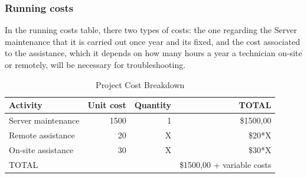\newpage 

\subsubsection{Running costs}
In the running costs table, there two types of costs: the one regarding the Server maintenance that it is carried out once year and its fixed, and the cost associated to the assistance, which it depends on how many hours a year a technician on-site or remotely, will be necessary for troubleshooting.
\begin{table}[htbp]
    \centering
    \caption{Project Cost Breakdown} 
    \begin{tabular}{lrrr}
        \toprule
        Activity & Unit cost & Quantity & TOTAL \\
        \midrule
        Server maintenance & 1500 & 1 & \$1500,00 \\
        Remote assistance & 20 & X & \$20*X \\
        On-site assistance & 30 & X & \$30*X \\
        \midrule
        TOTAL & & & \$1500,00 + variable costs \\
        \bottomrule
    \end{tabular}
\end{table}
